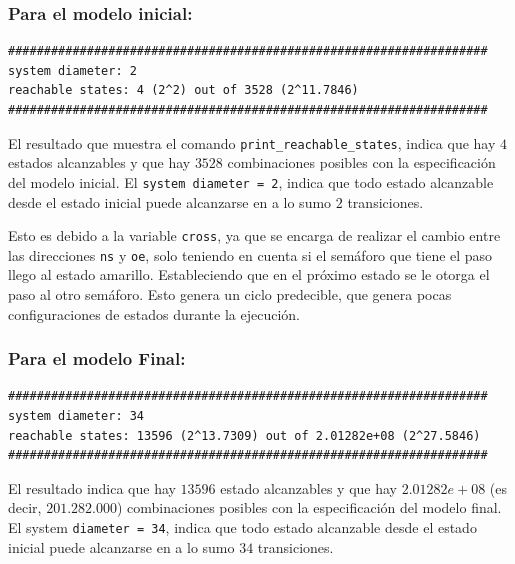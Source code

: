 \subsubsection*{Para el modelo inicial:}

\begin{lstlisting}[language=NuSMV, caption={Resultado de ejecutar el comando \texttt{print\_reachable\_states} para el modelo inicial}, label=list:reachable_states]
###################################################################
system diameter: 2
reachable states: 4 (2^2) out of 3528 (2^11.7846)
###################################################################
\end{lstlisting}

El resultado que muestra el comando \texttt{print\_reachable\_states}, indica que hay $4$ estados alcanzables y que hay $3528$ combinaciones posibles con la especificación del modelo inicial. El \texttt{system diameter = 2}, indica que todo estado alcanzable desde el estado inicial puede alcanzarse en a lo sumo $2$ transiciones.

Esto es debido a la variable \texttt{cross}, ya que se encarga de realizar el cambio entre las direcciones \texttt{ns} y \texttt{oe}, solo teniendo en cuenta si el semáforo que tiene el paso llego al estado amarillo. Estableciendo que en el próximo estado se le otorga el paso al otro semáforo. Esto genera un ciclo predecible, que genera pocas configuraciones de estados durante la ejecución.

\subsubsection*{Para el modelo Final:}

\begin{lstlisting}[language=NuSMV, caption={Resultado de ejecutar el comando \texttt{print\_reachable\_states} para el modelo inicial}, label=list:reachable_states]
###################################################################
system diameter: 34
reachable states: 13596 (2^13.7309) out of 2.01282e+08 (2^27.5846)
###################################################################
\end{lstlisting}

El resultado indica que hay $13596$ estado alcanzables y que hay $2.01282e+08$ (es decir, $201{.}282{.}000$) combinaciones posibles con la especificación del modelo final. El system \texttt{diameter = 34}, indica que todo estado alcanzable desde el estado inicial puede alcanzarse en a lo sumo $34$ transiciones.

